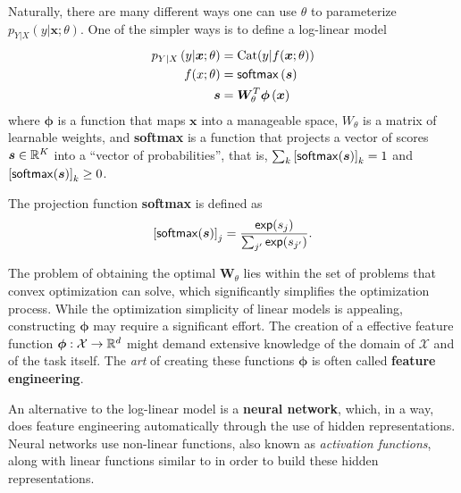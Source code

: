 \noindent Naturally, there are many different ways one can use $\theta$ to
parameterize $p_{Y|X}\left(y|\bm{x};\theta\right)$. One of the simpler ways
is to define a log-linear model
%
\begin{align}
    p_{Y|X}\left(y|\bm{x};\theta\right) & = \text{Cat}(y|f(\bm x; \theta)) \\
    f(x; \theta)                        & = \operatorname*{\mathsf{softmax}} \left(\bm{s}\right)   \\
    \bm{s}                              & 
    = \bm{W}_{\theta}^T\bm{\phi}\left(\bm{x}\right) \label{eq:linear}
\end{align}
%
where $\bm{\phi}$ is a function that maps $\bm{x}$ into a
manageable space, $W_{\theta}$ is a matrix of learnable weights, and
\textbf{softmax} is a function that projects a vector of scores $\bm{s}\in\mathbb{R}^K$ into
a ``vector of probabilities'', that is, $\sum_k\left[\operatorname*{\mathsf{softmax}}(\bm{s})\right]_k=1$
and $\left[\operatorname*{\mathsf{softmax}}(\bm{s})\right]_k \geq 0$.

\begin{definition}[softmax]
    The projection function \textbf{softmax} is defined as
    \begin{equation}\label{eq:softmax}
        \left[\operatorname*{\mathsf{softmax}}(\bm{s})\right]_j = \frac{\operatorname*{\mathsf{exp}}(s_j)}{\sum_{j'} \operatorname*{\mathsf{exp}}(s_{j'})}.
    \end{equation}
\end{definition}

The problem of obtaining the optimal $\bm{W}_{\theta}$ lies
within the set of problems that convex optimization can solve, which
significantly simplifies the optimization process. While the
optimization simplicity of linear models is appealing, constructing
$\bm{\phi}$ may require a significant effort. The creation of a
effective feature function $\bm{\phi}: \mathcal{X} \rightarrow \mathbb{R}^d$ might
demand extensive knowledge of the domain of $\mathcal{X}$ and of the
task itself. The \textit{art} of creating these functions $\bm{\phi}$
is often called \textbf{feature engineering}.

An alternative to the log-linear model is a \textbf{neural network}, which, in a
way, does feature engineering automatically through the use of hidden
representations. Neural networks use non-linear functions, also known
as \textit{activation functions}, along with linear functions similar
to  in order to build these hidden representations.

